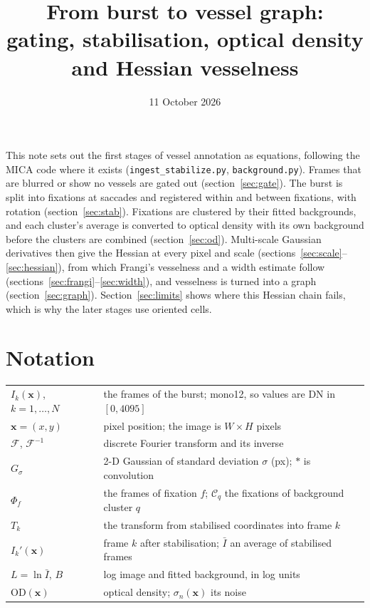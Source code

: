 \documentclass[11pt]{article}
\title{From burst to vessel graph:\\ gating, stabilisation, optical density and Hessian vesselness}
\author{}
\date{11 October 2026}
\newcommand{\F}{\mathcal{F}}
\newcommand{\Fi}{\mathcal{F}^{-1}}
\newcommand{\x}{\mathbf{x}}
\newcommand{\OD}{\mathrm{OD}}
\begin{document}
\maketitle

\noindent This note sets out the first stages of vessel annotation as equations, following the MICA code where it
exists (\texttt{ingest\_stabilize.py}, \texttt{background.py}). Frames that are blurred or show no vessels are gated
out (section~\ref{sec:gate}). The burst is split into fixations at saccades and registered within and between
fixations, with rotation (section~\ref{sec:stab}). Fixations are clustered by their fitted backgrounds, and each
cluster's average is converted to optical density with its own background before the clusters are combined
(section~\ref{sec:od}). Multi-scale Gaussian derivatives then give the Hessian at every pixel and scale
(sections~\ref{sec:scale}--\ref{sec:hessian}), from which Frangi's vesselness and a width estimate follow
(sections~\ref{sec:frangi}--\ref{sec:width}), and vesselness is turned into a graph (section~\ref{sec:graph}).
Section~\ref{sec:limits} shows where this Hessian chain fails, which is why the later stages use oriented cells.

\section*{Notation}
\begin{tabular}{@{}ll@{}}
$I_k(\x)$, $k = 1,\dots,N$ & the frames of the burst; mono12, so values are DN in $[0, 4095]$ \\
$\x = (x, y)$ & pixel position; the image is $W \times H$ pixels \\
$\F$, $\Fi$ & discrete Fourier transform and its inverse \\
$G_\sigma$ & 2-D Gaussian of standard deviation $\sigma$ (px); $*$ is convolution \\
$\Phi_f$ & the frames of fixation $f$; $\mathcal C_q$ the fixations of background cluster $q$ \\
$T_k$ & the transform from stabilised coordinates into frame $k$ \\
$I_k'(\x)$ & frame $k$ after stabilisation; $\bar I$ an average of stabilised frames \\
$L = \ln \bar I$, $B$ & log image and fitted background, in log units \\
$\OD(\x)$ & optical density; $\sigma_n(\x)$ its noise \\
\end{tabular}
\end{document}
